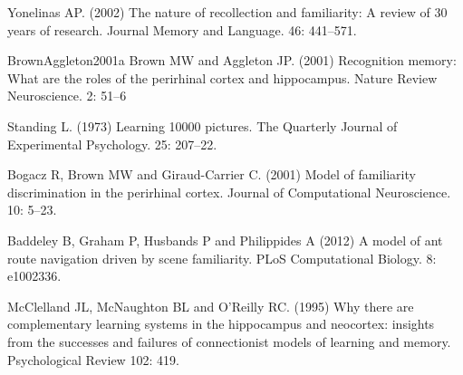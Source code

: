 \documentclass[11pt,a4paper]{scrartcl}
\begin{document}
\begin{thebibliography}{10}

Yonelinas AP. (2002) The nature of recollection and familiarity: A
review of 30 years of research. 
\newblock Journal Memory and Language. 46: 441--571.

\item{BrownAggleton2001a}
Brown MW and Aggleton JP. (2001) Recognition memory: What are the
roles of the perirhinal cortex and hippocampus. 
\newblock Nature Review Neuroscience. 2: 51--6

Standing L. (1973) Learning 10000 pictures.
\newblock  The Quarterly Journal of Experimental Psychology. 25: 207--22.

Bogacz R, Brown MW and Giraud-Carrier C. (2001) Model of familiarity discrimination in the perirhinal cortex.
\newblock Journal of Computational Neuroscience. 10: 5--23.

Baddeley B, Graham P, Husbands P and Philippides A (2012) A model of ant route navigation driven by scene familiarity. 
\newblock PLoS Computational Biology. 8: e1002336.

McClelland JL, McNaughton BL and O'Reilly RC. (1995) Why there are complementary learning systems in the hippocampus and neocortex: insights from the successes and failures of connectionist models of learning and memory.
\newblock Psychological Review 102: 419.

\end{thebibliography}
\end{document}
